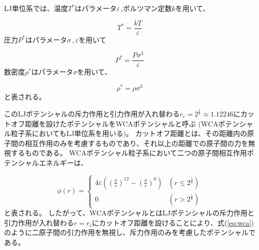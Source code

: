\documentclass[titlepage]{jsreport}
\begin{document}
\newpage
LJ単位系では、温度$T^*$はパラメータ$\varepsilon$\,,ボルツマン定数$k$を用いて、

\large
\begin{equation}
T^*=\frac{kT}{\varepsilon}\label{eq:T}
\end{equation}
\normalsize
圧力$P^*$はパラメータ${\sigma}$\,,\,${\varepsilon}$を用いて

\large
\begin{equation}
P^*=\frac{P\sigma^3}{\varepsilon}\label{eq:P}
\end{equation}
\normalsize
数密度$\rho^*$はパラメータ$\sigma$を用いて、

\large
\begin{equation}
\rho^*=\rho{\sigma}^3\label{eq:rho}
\end{equation}
\normalsize
と表される。

このLJポテンシャルの斥力作用と引力作用が入れ替わる$r_c=2^{\frac{1}{6}}{\approx}1.12246$にカットオフ距離を設けたポテンシャルをWCAポテンシャルと呼ぶ
(WCAポテンシャル粒子系においてもLJ単位系を用いる)。
カットオフ距離とは、その距離内の原子間の相互作用のみを考慮するものであり、それ以上の距離での原子間の力を無視するものである\cite{WATANABE20191}。
WCAポテンシャル粒子系において二つの原子間相互作用ポテンシャルエネルギーは、

\large
\begin{equation}
\phi(r) = \left\{ \begin{array}{ll}
    4{\varepsilon}\left(\left(\frac{\sigma}{r}\right)^{12}-\left(\frac{\sigma}{r}\right)^6\right) & (r\leq2^{\frac{1}{6}}) \\
    0 & (r>2^{\frac{1}{6}})\label{eq:wca}
\end{array} \right.
\end{equation}
\normalsize
と表される\cite{doi:10.1063/1.2176675}。
したがって、WCAポテンシャルとはLJポテンシャルの斥力作用と引力作用が入れ替わる$r=r_c$にカットオフ距離を設けることにより、式(\ref{eq:wca})のように二原子間の引力作用を無視し、斥力作用のみを考慮したポテンシャルである。
\end{document}

